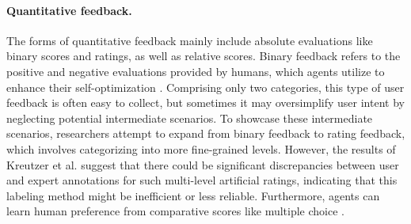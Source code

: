 \paragraph{Quantitative feedback.}
The forms of quantitative feedback mainly include absolute evaluations like binary scores and ratings, as well as relative scores. Binary feedback refers to the positive and negative evaluations provided by humans, which agents utilize to enhance their self-optimization \cite{DBLP:conf/iclr/LiMCRW17, DBLP:conf/acl/IyerKCKZ17, DBLP:conf/nips/Weston16, DBLP:journals/corr/abs-2208-03188, DBLP:journals/corr/abs-2204-03685}. Comprising only two categories, this type of user feedback is often easy to collect, but sometimes it may oversimplify user intent by neglecting potential intermediate scenarios. To showcase these intermediate scenarios, researchers attempt to expand from binary feedback to rating feedback, which involves categorizing into more fine-grained levels. However, the results of Kreutzer et al. \cite{DBLP:conf/naacl/KreutzerKMR18} suggest that there could be significant discrepancies between user and expert annotations for such multi-level artificial ratings, indicating that this labeling method might be inefficient or less reliable. Furthermore, agents can learn human preference from comparative scores like multiple choice \cite{DBLP:conf/acl/YavuzGSY18, DBLP:conf/emnlp/YaoSSY19}.

